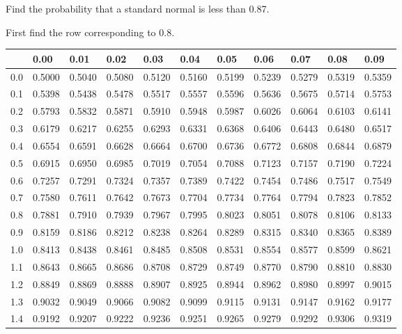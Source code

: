 \begin{frame}{\small Find the probability that a standard normal is less than 0.87.}
  
{\small First find the row corresponding to 0.8.}

  {
\fontsize{5pt}{5pt}
\selectfont

\begin{tabular}{l|llllllllll}
     & 0.00   & 0.01   & 0.02   & 0.03   & 0.04   & 0.05   & 0.06   & 0.07   & 0.08  & 0.09 \\ \hline
0.0 & 0.5000 & 0.5040 & 0.5080 & 0.5120 & 0.5160 & 0.5199 & 0.5239 & 0.5279 & 0.5319 & 0.5359 \\ 
0.1 & 0.5398 & 0.5438 & 0.5478 & 0.5517 & 0.5557 & 0.5596 & 0.5636 & 0.5675 & 0.5714 & 0.5753 \\ 
0.2 & 0.5793 & 0.5832 & 0.5871 & 0.5910 & 0.5948 & 0.5987 & 0.6026 & 0.6064 & 0.6103 & 0.6141 \\ 
0.3 & 0.6179 & 0.6217 & 0.6255 & 0.6293 & 0.6331 & 0.6368 & 0.6406 & 0.6443 & 0.6480 & 0.6517 \\ 
0.4 & 0.6554 & 0.6591 & 0.6628 & 0.6664 & 0.6700 & 0.6736 & 0.6772 & 0.6808 & 0.6844 & 0.6879 \\ 
0.5 & 0.6915 & 0.6950 & 0.6985 & 0.7019 & 0.7054 & 0.7088 & 0.7123 & 0.7157 & 0.7190 & 0.7224 \\ 
0.6 & 0.7257 & 0.7291 & 0.7324 & 0.7357 & 0.7389 & 0.7422 & 0.7454 & 0.7486 & 0.7517 & 0.7549 \\ 
0.7 & 0.7580 & 0.7611 & 0.7642 & 0.7673 & 0.7704 & 0.7734 & 0.7764 & 0.7794 & 0.7823 & 0.7852 \\ 
\rowcolor{light-red}0.8 & 0.7881 & 0.7910 & 0.7939 & 0.7967 & 0.7995 & 0.8023 & 0.8051 & 0.8078 & 0.8106 & 0.8133 \\ 
0.9 & 0.8159 & 0.8186 & 0.8212 & 0.8238 & 0.8264 & 0.8289 & 0.8315 & 0.8340 & 0.8365 & 0.8389 \\ 
1.0 & 0.8413 & 0.8438 & 0.8461 & 0.8485 & 0.8508 & 0.8531 & 0.8554 & 0.8577 & 0.8599 & 0.8621 \\ 
1.1 & 0.8643 & 0.8665 & 0.8686 & 0.8708 & 0.8729 & 0.8749 & 0.8770 & 0.8790 & 0.8810 & 0.8830 \\ 
1.2 & 0.8849 & 0.8869 & 0.8888 & 0.8907 & 0.8925 & 0.8944 & 0.8962 & 0.8980 & 0.8997 & 0.9015 \\ 
1.3 & 0.9032 & 0.9049 & 0.9066 & 0.9082 & 0.9099 & 0.9115 & 0.9131 & 0.9147 & 0.9162 & 0.9177 \\ 
1.4 & 0.9192 & 0.9207 & 0.9222 & 0.9236 & 0.9251 & 0.9265 & 0.9279 & 0.9292 & 0.9306 & 0.9319 \\ 

\end{tabular}}
\end{frame}
